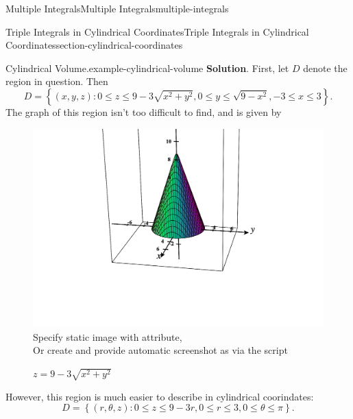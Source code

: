 \documentclass[oneside,10pt,]{book}
\numberwithin{equation}{section}
\newlength{\qrsize}
\newlength{\previewwidth}
\begin{document}
\begin{chapterptx}{Multiple Integrals}{}{Multiple Integrals}{}{}{multiple-integrals}
\begin{sectionptx}{Triple Integrals in Cylindrical Coordinates}{}{Triple Integrals in Cylindrical Coordinates}{}{}{section-cylindrical-coordinates}
\begin{example}{Cylindrical Volume.}{example-cylindrical-volume}
\noindent\textbf{Solution}.\hypertarget{solution-253}{}\quad%
\hypertarget{p-1528}{}%
First, let \(D\) denote the region in question. Then%
\begin{equation*}
D = \left\{(x,y,z) : 0\leq z\leq 9 - 3\sqrt{x^{2} + y^{2}}, 0\leq y \leq \sqrt{9 - x^{2}}, -3\leq x\leq 3\right\}\text{.}
\end{equation*}
The graph of this region isn't too difficult to find, and is given by \begin{figure}
\centering
\setlength{\qrsize}{9em}
\setlength{\previewwidth}{\linewidth}
\addtolength{\previewwidth}{-\qrsize}
\begin{tcbraster}[raster columns=2, raster column skip=1pt, raster halign=center, raster force size=false, raster left skip=0pt, raster right skip=0pt]%
\begin{tcolorbox}[previewstyle, width=\previewwidth]%
%
{\includegraphics[width=0.80\linewidth,height=\qrsize,keepaspectratio]{images/interactive-1-preview.png}}%
{\small{}Specify static image with  attribute,\\Or create and provide automatic screenshot as  via the  script}%
\end{tcolorbox}%
\begin{tcolorbox}[qrstyle]%
{\hypersetup{urlcolor=black}}%
\end{tcolorbox}%
\end{tcbraster}%
\caption{\(z = 9 - 3\sqrt{x^{2} + y^{2}}\)\label{figure-57}}
\end{figure}
 However, this region is much easier to describe in cylindrical coorindates:%
\begin{equation*}
D = \left\{(r,\theta,z) : 0\leq z\leq 9 - 3r, 0\leq r\leq 3, 0\leq \theta\leq \pi\right\}\text{.}

\end{equation*}
\end{example}
\end{sectionptx}
\end{chapterptx}
\end{document}
